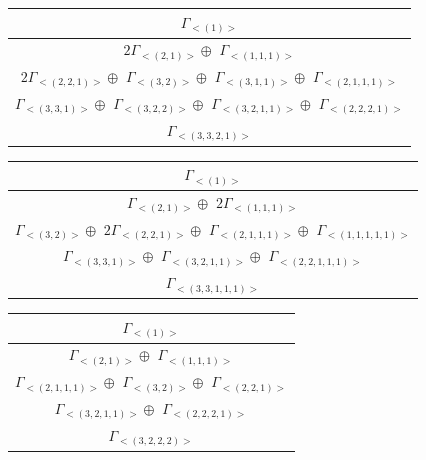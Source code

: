 \bigskip
\begin{minipage}{.526\textwidth}
\centering
\begin{tabular}{|c|}\hline
$\Gamma_{<(
1
)>}$
\\ \hline
$ 2 \Gamma_{<(
2 , 
1
)>} \oplus$
$\Gamma_{<(
1 , 
1 , 
1
)>}$
\\ \hline
$ 2 \Gamma_{<(
2 , 
2 , 
1
)>} \oplus$
$\Gamma_{<(
3 , 
2
)>} \oplus$
$\Gamma_{<(
3 , 
1 , 
1
)>} \oplus$
$\Gamma_{<(
2 , 
1 , 
1 , 
1
)>}$
\\ \hline
$\Gamma_{<(
3 , 
3 , 
1
)>} \oplus$
$\Gamma_{<(
3 , 
2 , 
2
)>} \oplus$
$\Gamma_{<(
3 , 
2 , 
1 , 
1
)>} \oplus$
$\Gamma_{<(
2 , 
2 , 
2 , 
1
)>}$
\\ \hline
$\Gamma_{<(
3 , 
3 , 
2 , 
1
)>}$
\\
\hline\end{tabular}\end{minipage}
\bigskip
\begin{minipage}{.54\textwidth}
\centering
\begin{tabular}{|c|}\hline
$\Gamma_{<(
1
)>}$
\\ \hline
$\Gamma_{<(
2 , 
1
)>} \oplus$
$ 2 \Gamma_{<(
1 , 
1 , 
1
)>}$
\\ \hline
$\Gamma_{<(
3 , 
2
)>} \oplus$
$ 2 \Gamma_{<(
2 , 
2 , 
1
)>} \oplus$
$\Gamma_{<(
2 , 
1 , 
1 , 
1
)>} \oplus$
$\Gamma_{<(
1 , 
1 , 
1 , 
1 , 
1
)>}$
\\ \hline
$\Gamma_{<(
3 , 
3 , 
1
)>} \oplus$
$\Gamma_{<(
3 , 
2 , 
1 , 
1
)>} \oplus$
$\Gamma_{<(
2 , 
2 , 
1 , 
1 , 
1
)>}$
\\ \hline
$\Gamma_{<(
3 , 
3 , 
1 , 
1 , 
1
)>}$
\\
\hline\end{tabular}\end{minipage}
\bigskip
\begin{minipage}{.4\textwidth}
\centering
\begin{tabular}{|c|}\hline
$\Gamma_{<(
1
)>}$
\\ \hline
$\Gamma_{<(
2 , 
1
)>} \oplus$
$\Gamma_{<(
1 , 
1 , 
1
)>}$
\\ \hline
$\Gamma_{<(
2 , 
1 , 
1 , 
1
)>} \oplus$
$\Gamma_{<(
3 , 
2
)>} \oplus$
$\Gamma_{<(
2 , 
2 , 
1
)>}$
\\ \hline
$\Gamma_{<(
3 , 
2 , 
1 , 
1
)>} \oplus$
$\Gamma_{<(
2 , 
2 , 
2 , 
1
)>}$
\\ \hline
$\Gamma_{<(
3 , 
2 , 
2 , 
2
)>}$
\\
\hline\end{tabular}\end{minipage}
